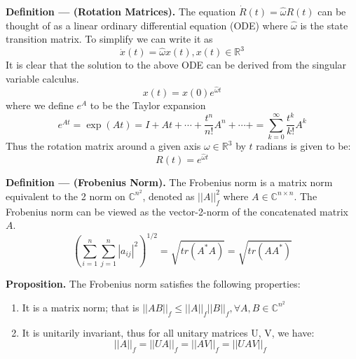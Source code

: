 \documentclass{article}
\begin{document}
\begin{tcolorbox}[enhanced,breakable, toggle left and right,sharp corners, colback=purple!5!white, colframe=purple!55!black, boxrule=0mm,top=0mm,bottom=0mm,leftrule=1mm, drop shadow=black!40!white]
    {\color{purple!55!black} \textbf{Definition --- (Rotation Matrices).}}
    The equation $\dot R(t) = \hat{\omega}R(t)$
    can be thought of as a linear ordinary differential equation (ODE) where $\hat{\omega}$ is the state transition matrix. To simplify we can write it as
    $$\dot x(t) = \hat{\omega}x(t), x(t) \in \mathbb{R}^3$$
    It is clear that the solution to the above ODE can be derived from the singular variable calculus.
    $$x(t) = x(0)e^{\hat{\omega}t}$$
    where we define $e^A$ to be the Taylor expansion 
    $$e^{At} = \exp{(At)} = I + At + \cdots + \frac{t^n}{n!}A^n + \cdots + = \sum_{k=0}^\infty \frac{t^k}{k!}A^k$$
    Thus the rotation matrix around a given axis $\omega \in \mathbb{R}^3$ by $t$ radians is given to be: 
    $$R(t) = e^{\hat{\omega}t}$$
\end{tcolorbox}


\begin{tcolorbox}[enhanced,breakable, sharp corners, colback=purple!5!white, colframe=purple!55!black, boxrule=0mm,top=0mm,bottom=0mm,leftrule=1mm, drop shadow=black!40!white]
    {\color{purple!55!black} \textbf{Definition --- (Frobenius Norm).}}
    The Frobenius norm is a matrix norm equivalent to the 2 norm on $\mathbb{C}^{n^2}$, denoted as $||A||_f^2$ where $A \in \mathbb{C}^{n\times n}$. The Frobenius norm can be viewed as the vector-2-norm of the concatenated matrix $A$. 
    $$\left(\sum^n_{i=1}\sum^n_{j=1}|a_{ij}|^2\right)^{1/2}=\sqrt{tr(A^*A)} =\sqrt{tr(AA^*)}$$

    \textbf{Proposition.} The Frobenius norm satisfies the following properties:
    \begin{enumerate}
        \item It is a matrix norm; that is $||AB||_f \leq ||A||_f||B||_f, \forall A,B \in \mathbb{C}^{n^2}$
        \item It is unitarily invariant, thus for all unitary matrices U, V, we have:
        $$||A||_f = ||UA||_f = ||AV||_f = ||UAV||_f$$
    \end{enumerate}
    
\end{tcolorbox}
\end{document}
